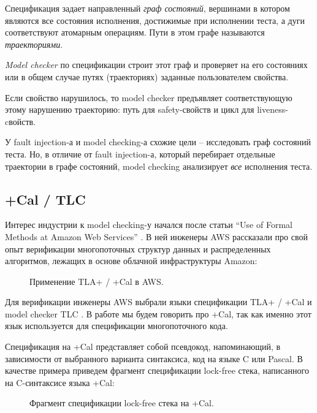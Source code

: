 Спецификация задает направленный \emph{граф состояний}, вершинами в котором являются все состояния исполнения, достижимые при исполнении теста, а дуги соответствуют атомарным операциям. Пути в этом графе называются \emph{траекториями}.

\emph{Model checker} по спецификации строит этот граф и проверяет на его состояниях или в общем случае путях (траекториях) заданные пользователем свойства. 

Если свойство нарушилось, то model checker предъявляет соответствующую этому нарушению траекторию: путь для safety-свойств и цикл для liveness-cвойств.

У fault injection-а и model checking-а схожие цели – исследовать граф состояний теста. Но, в отличие от fault injection-а, который перебирает отдельные траектории в графе состояний, model checking анализирует \emph{все} исполнения теста.


\subsection{+Cal / TLC}

Интерес индустрии к model checking-у начался после статьи “Use of Formal Methods at Amazon Web Services” \autocite{AWS}. В ней инженеры AWS рассказали про свой опыт верификации многопоточных структур данных и распределенных алгоритмов, лежащих в основе облачной инфраструктуры Amazon:
 
\begin{figure}
	\caption{Применение TLA+ / +Cal в AWS.}\label{fig:aws}
\end{figure}

Для верификации инженеры AWS выбрали языки спецификации TLA+ / +Cal и model checker TLC \autocite{Tla}. В работе мы будем говорить про +Cal, так как именно этот язык используется для спецификации многопоточного кода.

Спецификация на +Cal представляет собой псевдокод, напоминающий, в зависимости от выбранного варианта синтаксиса, код на языке C или Pascal. В качестве примера приведем фрагмент спецификации lock-free стека, написанного на C-синтаксисе языка +Cal:

\begin{figure}
\bigskip
\caption{Фрагмент спецификации lock-free стека на +Cal.}
\end{figure}



